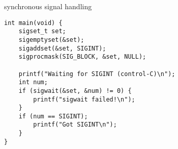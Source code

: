 \begin{frame}[fragile,label=syncSig]{synchronous signal handling}
\lstset{language=C,style=small}
\begin{lstlisting}
int main(void) {
    sigset_t set;
    sigemptyset(&set);
    sigaddset(&set, SIGINT);
    sigprocmask(SIG_BLOCK, &set, NULL);
    
    printf("Waiting for SIGINT (control-C)\n"); 
    int num;
    if (sigwait(&set, &num) != 0) {
        printf("sigwait failed!\n");
    }
    if (num == SIGINT);
        printf("Got SIGINT\n");
    }
}
\end{lstlisting}
\end{frame}

